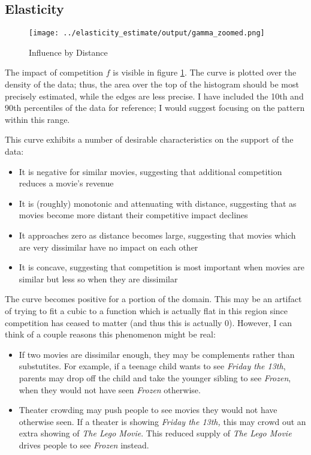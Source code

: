 \documentclass{article}
\begin{document}
\subsection{Elasticity}

\begin{center}
    \begin{figure}
        \texttt{[image: ../elasticity\_estimate/output/gamma\_zoomed.png]}
        \caption{Influence by Distance}
        \label{fig:gamma_zoomed}
    \end{figure}
\end{center}

The impact of competition $f$ is visible in figure \ref{fig:gamma_zoomed}. The curve is plotted over the density of the data; thus, the area over the top of the histogram should be most precisely estimated, while the edges are less precise. I have included the 10th and 90th percentiles of the data for reference; I would suggest focusing on the pattern within this range.

This curve exhibits a number of desirable characteristics on the support of the data:
\begin{itemize}
    \item It is negative for similar movies, suggesting that additional competition reduces a movie's revenue
    \item It is (roughly) monotonic and attenuating with distance, suggesting that as movies become more distant their competitive impact declines
    \item It approaches zero as distance becomes large, suggesting that movies which are very dissimilar have no impact on each other
    \item It is concave, suggesting that competition is most important when movies are similar but less so when they are dissimilar
\end{itemize}

The curve becomes positive for a portion of the domain. This may be an artifact of trying to fit a cubic to a function which is actually flat in this region since competition has ceased to matter (and thus this is actually 0). However, I can think of a couple reasons this phenomenon might be real:
\begin{itemize}
    \item If two movies are dissimilar enough, they may be complements rather than substutites. For example, if a teenage child wants to see \emph{Friday the 13th}, parents may drop off the child and take the younger sibling to see \emph{Frozen}, when they would not have seen \emph{Frozen} otherwise.
    \item Theater crowding may push people to see movies they would not have otherwise seen. If a theater is showing \emph{Friday the 13th,} this may crowd out an extra showing of \emph{The Lego Movie}. This reduced supply of \emph{The Lego Movie} drives people to see \emph{Frozen} instead.
\end{itemize}
\end{document}
